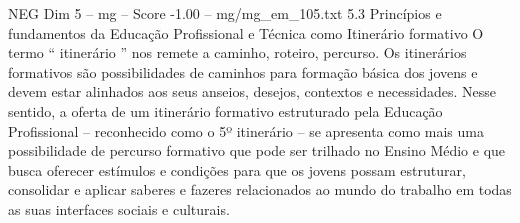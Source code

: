 \begin{textsample}{NEG Dim 5 – mg – Score -1.00 – mg/mg\_em\_105.txt}  \label{ex:f5_neg_104}
5.3 Princípios e fundamentos da Educação Profissional e Técnica como Itinerário formativo O termo “ itinerário ” nos remete a caminho, roteiro, percurso.
Os itinerários formativos são possibilidades de caminhos para formação básica dos jovens e devem estar alinhados aos seus anseios, desejos, contextos e necessidades.
Nesse sentido, a oferta de um itinerário formativo estruturado pela Educação Profissional – reconhecido como o 5º itinerário – se apresenta como mais uma possibilidade de percurso formativo que pode ser trilhado no Ensino Médio e que busca oferecer estímulos e condições para que os jovens possam estruturar, consolidar e aplicar saberes e fazeres relacionados ao mundo do trabalho em todas as suas interfaces sociais e culturais.

\end{textsample}
